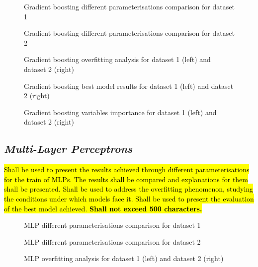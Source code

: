 \documentclass[10pt]{extarticle}
\newcommand{\ctext}[3][RGB]{%
  \begingroup
  \definecolor{hlcolor}{#1}{#2}\sethlcolor{hlcolor}%
  \hl{#3}%
  \endgroup
}
\begin{document}
\begin{figure}[H]
\caption{Gradient boosting different parameterisations comparison for dataset 1}
\end{figure}

\begin{figure}[H]
\caption{Gradient boosting different parameterisations comparison for dataset 2}
\end{figure}

\begin{figure}[H]
\caption{Gradient boosting overfitting analysis for dataset 1 (left) and dataset 2 (right)}
\end{figure}

\begin{figure}[H]
\caption{Gradient boosting best model results for dataset 1 (left) and dataset 2 (right)}
\end{figure}

\begin{figure}[H]
\caption{Gradient boosting variables importance for dataset 1 (left) and dataset 2 (right)}
\end{figure}

\subsection*{\textit{Multi-Layer Perceptrons}}
\ctext[RGB]{190,190,190}{Shall be used to present the results achieved through different parameterisations for the train of MLPs. The results shall be compared and explanations for them shall be presented. Shall be used to address the overfitting phenomenon, studying the conditions under which models face it. Shall be used to present the evaluation of the best model achieved.  \textbf{Shall not exceed 500 characters.}}

\begin{figure}[H]
\caption{MLP different parameterisations comparison for dataset 1}
\end{figure}

\begin{figure}[H]
\caption{MLP different parameterisations comparison for dataset 2}
\end{figure}

\begin{figure}[H]
\caption{MLP overfitting analysis for dataset 1 (left) and dataset 2 (right)}
\end{figure}
\end{document}
